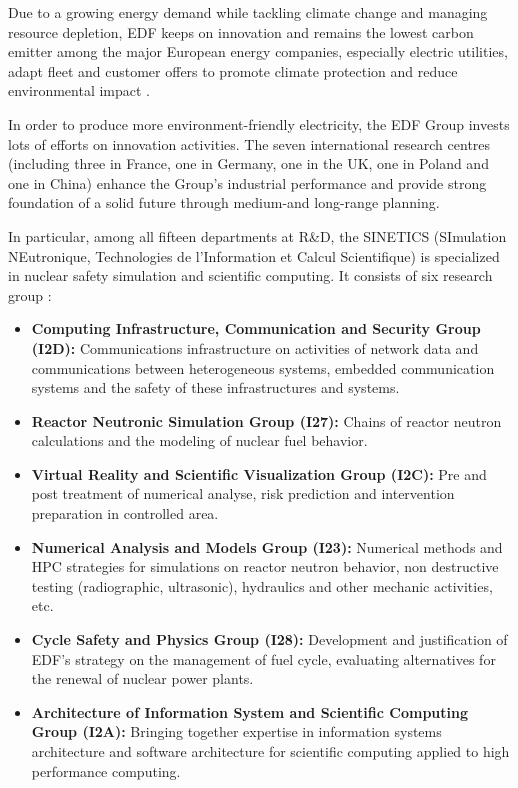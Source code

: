 Due to a growing energy demand while tackling climate change and managing resource depletion, EDF keeps on innovation and remains the lowest carbon emitter among the major European energy companies, especially electric utilities, adapt fleet and customer offers to promote climate protection and reduce environmental impact \citep{edfgroup}.

In order to produce more environment-friendly electricity, the EDF Group invests lots of efforts on innovation activities. The seven international research centres (including three in France, one in Germany, one in the UK, one in Poland and one in China) enhance the Group's industrial performance and provide strong foundation of a solid future through medium-and long-range planning.

In particular, among all fifteen departments at R\&D, the SINETICS (SImulation NEutronique, Technologies de l’Information et Calcul Scientifique) is specialized in nuclear safety simulation and scientific computing. It consists of six research group \citep{sinetics}:
\begin{itemize}
  \it
  \item \textbf{Computing Infrastructure, Communication and Security Group (I2D): }Communications infrastructure on activities of network data and communications between heterogeneous systems, embedded communication systems and the safety of these infrastructures and systems.
  \item \textbf{Reactor Neutronic Simulation Group (I27):} Chains of reactor neutron calculations and the modeling of nuclear fuel behavior.
  \item \textbf{Virtual Reality and Scientific Visualization Group (I2C):} Pre and post treatment of numerical analyse, risk prediction and intervention preparation in controlled area.
	\item \textbf{Numerical Analysis and Models Group (I23):} Numerical methods and HPC strategies  for simulations on reactor neutron behavior, non destructive testing (radiographic, ultrasonic), hydraulics and other mechanic activities, etc.
	\item \textbf{Cycle Safety and Physics Group (I28):} Development and justification of EDF's strategy on the management of fuel cycle, evaluating alternatives for the renewal of nuclear power plants.
	\item \textbf{Architecture of Information System and Scientific Computing Group (I2A):} Bringing together expertise in information systems architecture and software architecture for scientific computing applied to high performance computing.
\end{itemize}
